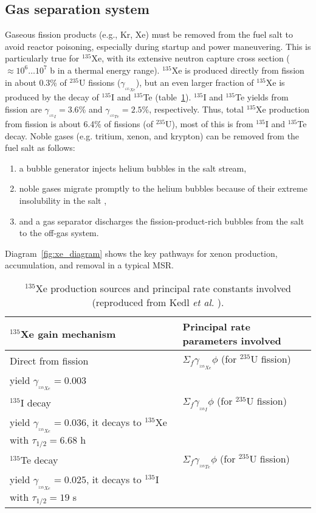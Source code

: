 \subsection{Gas separation system} \label{sec:gas-separ}
Gaseous fission products (e.g., Kr, Xe) must be removed from the fuel salt 
to avoid reactor poisoning, especially during startup and power maneuvering. 
This is particularly true for $^{135}$Xe, with its extensive neutron capture 
cross section ($\approx10^6\dots10^7$ b in a thermal energy range). $^{135}$Xe 
is produced directly from fission in about 0.3\% of $^{235}$U fissions 
($\gamma_{_{^{135}Xe}}$), but an even larger fraction of $^{135}$Xe is 
produced by the decay of $^{135}$I and $^{135}$Te (table~\ref{tab:xe_gain}). 
$^{135}$I and $^{135}$Te yields from fission are 
$\gamma_{_{^{135}I}}\!=3.6$\% and $\gamma_{_{^{135}Te}}\!=2.5$\%, 
respectively. Thus, total $^{135}$Xe production  
from fission is about 6.4\% of fissions (of $^{235}$U), most of this is from 
$^{135}$I and $^{135}$Te decay. Noble gases (e.g. tritium, xenon, and krypton) can 
be removed from the fuel salt as follows:
\begin{enumerate}
    \item a bubble generator injects helium bubbles in the salt stream,
    \item noble gases migrate promptly to the helium bubbles because 
              of their extreme insolubility in the salt 
              \cite{robertson_conceptual_1971},
    \item and a gas separator discharges the fission-product-rich bubbles from 
              the salt to the off-gas system.
\end{enumerate}
Diagram~\ref{fig:xe_diagram} shows the key pathways for xenon 
production, accumulation, and removal in a typical \gls{MSR}.
\begin{table}[ht!]
	\caption{$^{135}$Xe production sources and principal rate constants 
		involved
		(reproduced from Kedl \emph{et al.} \cite{kedl_development_1967}).}
	\centering
	\begin{tabularx}{\textwidth}{b  b}
		\hline \textbf{$^{135}$Xe gain mechanism} & \textbf{Principal rate 
			parameters involved}  	\\ [5pt] \hline 
		Direct from fission & $\Sigma_f \gamma_{_{^{135}Xe}}\phi$ (for 
		$^{235}$U fission) \\
		yield $\gamma_{_{^{135}Xe}}\!\!\!=0.003$ & \\ [5pt] \hline 
		$^{135}$I decay     & $\Sigma_f \gamma_{_{^{135}I}}\phi$ (for 
		$^{235}$U fission) \\
		yield $\gamma_{_{^{135}Xe}}\!\!\!=0.036$, it decays to $^{135}$Xe with 
		$\tau_{1/2}=6.68$ h & 			                    \\	[5pt]	\hline 
		$^{135}$Te decay    & $\Sigma_f \gamma_{_{^{135}Te}}\phi$ (for 
		$^{235}$U 		fission) \\
		yield $\gamma_{_{^{135}Xe}}\!\!\!=0.025$, 
		it decays to $^{135}$I with $\tau_{1/2}=19$ s 
		& 			                    \\ [5pt]	\hline
	\end{tabularx}
	\label{tab:xe_gain}
\end{table}
